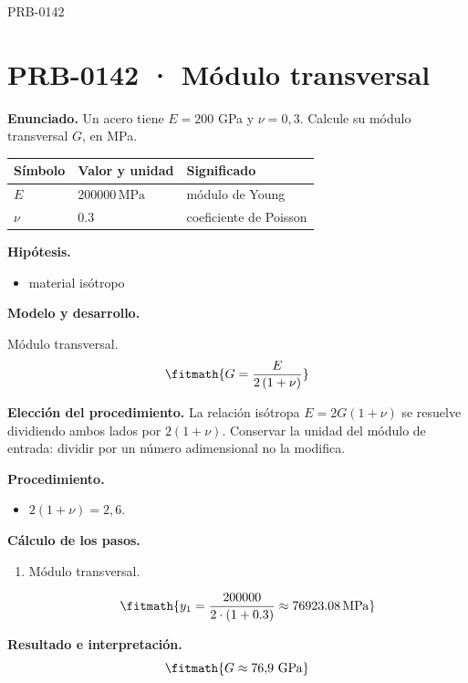 \begin{studiumworked}{PRB-0142}

\section{PRB-0142 · Módulo transversal}

\textbf{Enunciado.} Un acero tiene $E = 200$ GPa y $\nu = 0{,}3$. Calcule su módulo transversal $G$, en MPa.

\par\medskip\noindent\begin{tabular}{@{}p{.18\linewidth}p{.26\linewidth}p{.48\linewidth}@{}}
\toprule Símbolo & Valor y unidad & Significado\\\midrule
$E$ & $200000\,\mathrm{MPa}$ & módulo de Young\\
$\nu$ & $0.3$ & coeficiente de Poisson\\
\bottomrule\end{tabular}\par\medskip

\textbf{Hipótesis.}\begin{itemize}\item material isótropo\end{itemize}

\textbf{Modelo y desarrollo.}

Módulo transversal.\[\fitmath{G = \frac{E}{2\,(1 + \nu)}}\]

\textbf{Elección del procedimiento.} La relación isótropa $E=2G(1+\nu)$ se resuelve dividiendo ambos lados por $2(1+\nu)$. Conservar la unidad del módulo de entrada: dividir por un número adimensional no la modifica.

\textbf{Procedimiento.}\begin{itemize}\item $2(1 + \nu) = 2{,}6$.\end{itemize}

\textbf{Cálculo de los pasos.}

\begin{enumerate}

\item Módulo transversal.

\[\fitmath{y_{1}=\frac{200000}{2\cdot \left(1+0.3\right)}\approx 76923.08\,\mathrm{MPa}}\]

\end{enumerate}

\textbf{Resultado e interpretación.}\[\fitmath{G \approx 76{,}9\ \mathrm{GPa}}\]


\end{studiumworked}
